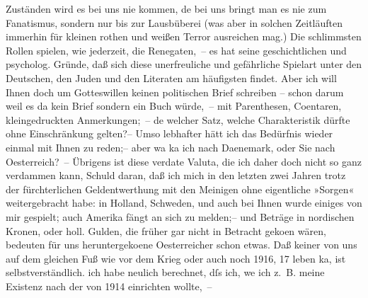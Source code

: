 \begin{ledgroupsized}[t]{13cm}
               Zuständen wird es bei uns nie kommen, de{\geminationn} bei uns bringt
               man \strikeout{\textcolor{gray}{×}\-\textcolor{gray}{×}} es nie zum Fanatismus, sondern nur \introOben{}bis\introOben{} zur
               Lausbüberei (was aber in solchen Zeitläuften immerhin für kleinen rothen und weißen
               Terror ausreichen mag.) Die schlimmsten Rollen spielen, wie jederzeit, die
               Renegaten, – es hat seine geschichtlichen \introOben{}und psycholog.\introOben{}
               Gründe, daß sich diese \introOben{}unerfreuliche und gefährliche\introOben{}
               Spielart unter den Deutschen, den Juden und den Literaten am häufigsten findet.\pend
           \pstart
           {\pb}Aber ich will Ihnen doch um Gotteswillen keinen
               politischen Brief schreiben – schon darum weil es da{\geminationn}
               kein Brief sondern ein Buch würde, – mit Parenthesen, Co{\geminationm}entaren, kleingedruckten Anmerkungen; – de{\geminationn} welcher
               Satz, welche Charakteristik dürfte ohne Einschränkung gelten?– Umso lebhafter hätt
               ich das Bedürfnis wieder einmal mit Ihnen zu reden;– aber wa{\geminationn} ka{\geminationn} ich nach Daenemark, oder Sie nach Oesterreich? –\pend
           \pstart
           Übrigens ist  diese verda{\geminationm}te Valuta, die ich daher doch nicht so ganz verdammen
               kann, \introOben{}Schuld daran\introOben{}, daß ich mich in den letzten zwei Jahren
               trotz der fürchterlichen Geldentwerthung mit den Meinigen ohne eigentliche »Sorgen«
               weitergebracht habe: in Holland, Schweden, und auch bei Ihnen wurde einiges von
               mir gespielt; auch Amerika fängt an sich zu
               melden;– und  Beträge in nordischen Kronen, oder holl. Gulden, die früher gar nicht in Betracht geko{\geminationm}en {\pb}wären, bedeuten
               für uns heruntergeko{\geminationm}ene Oesterreicher schon etwas. Daß keiner von uns auf dem gleichen
               Fuß wie vor dem Krieg oder auch noch 1916, 17 leben ka{\geminationn}, ist selbstverständlich. ich habe neulich berechnet,
               dſs ich, we{\geminationn} ich z. B. meine Existenz nach  der von 1914 einrichten wollte, –

\end{ledgroupsized}
